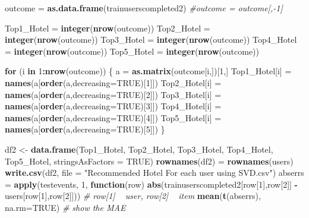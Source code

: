 \documentclass[]{article}
\newenvironment{Shaded}{\begin{snugshade}}{\end{snugshade}}
\newcommand{\CommentTok}[1]{\textcolor[rgb]{0.56,0.35,0.01}{\textit{#1}}}
\newcommand{\ControlFlowTok}[1]{\textcolor[rgb]{0.13,0.29,0.53}{\textbf{#1}}}
\newcommand{\DataTypeTok}[1]{\textcolor[rgb]{0.13,0.29,0.53}{#1}}
\newcommand{\DecValTok}[1]{\textcolor[rgb]{0.00,0.00,0.81}{#1}}
\newcommand{\KeywordTok}[1]{\textcolor[rgb]{0.13,0.29,0.53}{\textbf{#1}}}
\newcommand{\NormalTok}[1]{#1}
\newcommand{\OperatorTok}[1]{\textcolor[rgb]{0.81,0.36,0.00}{\textbf{#1}}}
\newcommand{\OtherTok}[1]{\textcolor[rgb]{0.56,0.35,0.01}{#1}}
\newcommand{\StringTok}[1]{\textcolor[rgb]{0.31,0.60,0.02}{#1}}
\begin{document}
\begin{Shaded}
\begin{Highlighting}[]
\NormalTok{outcome =}\StringTok{ }\KeywordTok{as.data.frame}\NormalTok{(trainuserscompleted2)}
\CommentTok{#outcome = outcome[,-1]}

\NormalTok{Top1_Hotel =}\StringTok{ }\KeywordTok{integer}\NormalTok{(}\KeywordTok{nrow}\NormalTok{(outcome))}
\NormalTok{Top2_Hotel =}\StringTok{ }\KeywordTok{integer}\NormalTok{(}\KeywordTok{nrow}\NormalTok{(outcome))}
\NormalTok{Top3_Hotel =}\StringTok{ }\KeywordTok{integer}\NormalTok{(}\KeywordTok{nrow}\NormalTok{(outcome))}
\NormalTok{Top4_Hotel =}\StringTok{ }\KeywordTok{integer}\NormalTok{(}\KeywordTok{nrow}\NormalTok{(outcome))}
\NormalTok{Top5_Hotel =}\StringTok{ }\KeywordTok{integer}\NormalTok{(}\KeywordTok{nrow}\NormalTok{(outcome))}

\ControlFlowTok{for}\NormalTok{ (i }\ControlFlowTok{in} \DecValTok{1}\OperatorTok{:}\KeywordTok{nrow}\NormalTok{(outcome)) \{}
\NormalTok{  a =}\StringTok{ }\KeywordTok{as.matrix}\NormalTok{(outcome[i,])[}\DecValTok{1}\NormalTok{,]}
\NormalTok{  Top1_Hotel[i] =}\StringTok{ }\KeywordTok{names}\NormalTok{(a[}\KeywordTok{order}\NormalTok{(a,}\DataTypeTok{decreasing=}\OtherTok{TRUE}\NormalTok{)[}\DecValTok{1}\NormalTok{]])}
\NormalTok{  Top2_Hotel[i] =}\StringTok{ }\KeywordTok{names}\NormalTok{(a[}\KeywordTok{order}\NormalTok{(a,}\DataTypeTok{decreasing=}\OtherTok{TRUE}\NormalTok{)[}\DecValTok{2}\NormalTok{]])}
\NormalTok{  Top3_Hotel[i] =}\StringTok{ }\KeywordTok{names}\NormalTok{(a[}\KeywordTok{order}\NormalTok{(a,}\DataTypeTok{decreasing=}\OtherTok{TRUE}\NormalTok{)[}\DecValTok{3}\NormalTok{]])}
\NormalTok{  Top4_Hotel[i] =}\StringTok{ }\KeywordTok{names}\NormalTok{(a[}\KeywordTok{order}\NormalTok{(a,}\DataTypeTok{decreasing=}\OtherTok{TRUE}\NormalTok{)[}\DecValTok{4}\NormalTok{]])}
\NormalTok{  Top5_Hotel[i] =}\StringTok{ }\KeywordTok{names}\NormalTok{(a[}\KeywordTok{order}\NormalTok{(a,}\DataTypeTok{decreasing=}\OtherTok{TRUE}\NormalTok{)[}\DecValTok{5}\NormalTok{]])}
\NormalTok{\}}

\NormalTok{df2 <-}\StringTok{ }\KeywordTok{data.frame}\NormalTok{(Top1_Hotel, Top2_Hotel, Top3_Hotel, Top4_Hotel, Top5_Hotel, }\DataTypeTok{stringsAsFactors =} \OtherTok{TRUE}\NormalTok{)}
\KeywordTok{rownames}\NormalTok{(df2) =}\StringTok{ }\KeywordTok{rownames}\NormalTok{(users)}
\KeywordTok{write.csv}\NormalTok{(df2, }\DataTypeTok{file =} \StringTok{"Recommended Hotel For each user using SVD.csv"}\NormalTok{)}
\NormalTok{abserrs =}\StringTok{ }\KeywordTok{apply}\NormalTok{(testevents, }\DecValTok{1}\NormalTok{, }\ControlFlowTok{function}\NormalTok{(row) }\KeywordTok{abs}\NormalTok{(trainuserscompleted2[row[}\DecValTok{1}\NormalTok{],row[}\DecValTok{2}\NormalTok{]] }\OperatorTok{-}\StringTok{ }\NormalTok{users[row[}\DecValTok{1}\NormalTok{],row[}\DecValTok{2}\NormalTok{]])) }\CommentTok{# row[1] ~ user, row[2] ~ item}
\KeywordTok{mean}\NormalTok{(}\KeywordTok{t}\NormalTok{(abserrs), }\DataTypeTok{na.rm=}\OtherTok{TRUE}\NormalTok{) }\CommentTok{# show the MAE}
\end{Highlighting}
\end{Shaded}
\end{document}
